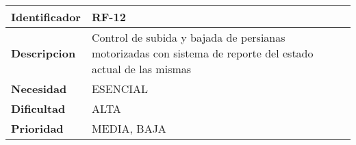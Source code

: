 \begin{center}
    \begin{tabular}{|p{2.6cm}|p{12cm}|}
    \hline
    \textbf{Identificador} & RF-12\\
    \hline
    \textbf{Descripcion} & Control de subida y bajada de persianas motorizadas con sistema de reporte del estado actual de las mismas\\
    \hline
    \textbf{Necesidad} & ESENCIAL\\
    \hline
    \textbf{Dificultad} & ALTA\\
    \hline
    \textbf{Prioridad} & MEDIA, BAJA\\
    \hline
    \end{tabular}
\end{center}

